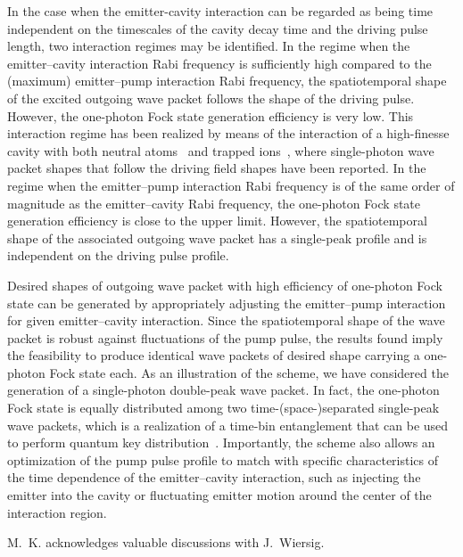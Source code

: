 \documentclass[pra, twocolumn]{revtex4}
\begin{document}
In the case when the emitter-cavity interaction can be regarded as
being time independent on the timescales of the cavity decay time and
the driving pulse length, two interaction regimes may be identified.
%
In the regime
when the emitter--cavity interaction
%
Rabi frequency
is
sufficiently high compared to
the (maximum) emitter--pump interaction
Rabi frequency,
the spatiotemporal
shape
of the excited outgoing wave packet follows the
shape
of the driving pulse.
However, the one-photon Fock state generation efficiency
is very low. This interaction regime
has been realized by means of the interaction of a high-finesse cavity with
both neutral atoms~\cite{kuhn:067901} and trapped ions~\cite{keller:1075},
where
single-photon wave packet
shapes
that follow the driving field
shapes
have been reported.
In the regime
when the
emitter--pump interaction
Rabi frequency
is of the same order of magnitude as the emitter--cavity
Rabi frequency,
the one-photon Fock state generation efficiency is close to the upper limit.
However, the spatiotemporal shape of the associated outgoing wave packet
has a single-peak profile
and is
independent on the driving pulse profile.
%

Desired shapes of outgoing wave packet 
with high efficiency of one-photon Fock state
can be generated
by appropriately adjusting 
the emitter--pump interaction
for given emitter--cavity interaction.
Since the
spatiotemporal shape of the wave packet is robust against
fluctuations of 
the pump pulse,
the results found imply the feasibility
to produce identical wave packets of desired shape
carrying a one-photon Fock state each.
%
As an
illustration of the
scheme,
we have considered the generation of
a single-photon double-peak wave packet.
In fact,
the one-photon Fock state is equally distributed
%
among
two time-(space-)separated
single-peak wave packets, which is a realization of a
time-bin entanglement that can be used to perform quantum key
distribution~\cite{tittel:4737}.
%
Importantly,
the scheme also allows an
optimization of the pump pulse profile
to match
with specific characteristics of
the time dependence of the emitter--cavity interaction,
such as injecting
the emitter into the cavity
or fluctuating emitter motion
around the center of the interaction region.



\begin{acknowledgments}
  M.~K. acknowledges valuable discussions with J.~Wiersig.
\end{acknowledgments}
\end{document}
